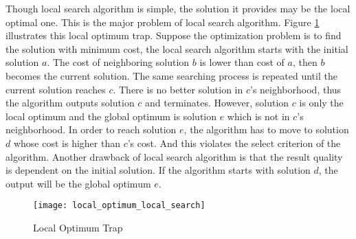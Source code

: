 	Though local search algorithm is simple, the solution it provides may be the local optimal one. This is the major problem of
	local search algorithm. Figure \ref{fig:local_optimum_local_search} illustrates this local optimum trap. Suppose the
	optimization problem is to find the solution with minimum cost, the local search algorithm starts with the initial solution $a$.
	The cost of neighboring solution $b$ is lower than cost of $a$, then $b$ becomes the current solution. The same searching process 
	is repeated until the current solution reaches $c$. There is no better solution in $c$'s neighborhood, thus the algorithm outputs solution $c$ and terminates. However, solution $c$ is only the local optimum and the global optimum is solution $e$ which
	is not in $c$'s neighborhood. In order to reach solution $e$, the algorithm has to move to solution $d$ whose cost is higher than
	$c$'s cost. And this violates the select criterion of the algorithm. Another drawback of local search algorithm is that the result quality is dependent on the initial solution. If the algorithm starts with solution $d$, the output will be the global optimum $e$. 
	
	\begin{figure}[H]
		\begin{center}
			\texttt{[image: local\_optimum\_local\_search]}
			\caption[Local Optimum Problem]{Local Optimum Trap}
			\label{fig:local_optimum_local_search}
		\end{center}
	\end{figure}		
